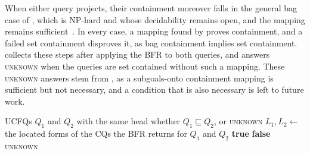 When either query projects, their containment moreover falls in the general bag case of , which is NP-hard and whose decidability remains open, and the mapping remains sufficient~\cite[Proposition~2, Case~5]{Afrati2010}.
In every case, a mapping found by  proves containment, and a failed set containment disproves it, as bag containment implies set containment.
 collects these steps after applying the \ac{BFR} to both queries, and answers \textsc{unknown} when the queries are set contained without such a mapping.
These \textsc{unknown} answers stem from , as a subgoals-onto containment mapping is sufficient but not necessary, and a condition that is also necessary is left to future work.

\begin{algorithm}
  \caption{Deciding containment of \acp{UCFQ}}
  \label{alg_ucfq_containment}
  \begin{algorithmic}[1]
    \Require \acp{UCFQ} $Q_1$ and $Q_2$ with the same head
    \Ensure whether $Q_1 \sqsubseteq Q_2$, or \textsc{unknown}
    \State $L_1, L_2 \gets$ the located forms of the \acp{CQ} the \ac{BFR} returns for $Q_1$ and $Q_2$
      \State \Return \textbf{true}
    \EndIf
      \State \Return \textbf{false}
    \EndIf
    \State \Return \textsc{unknown}
  \end{algorithmic}
\end{algorithm}
